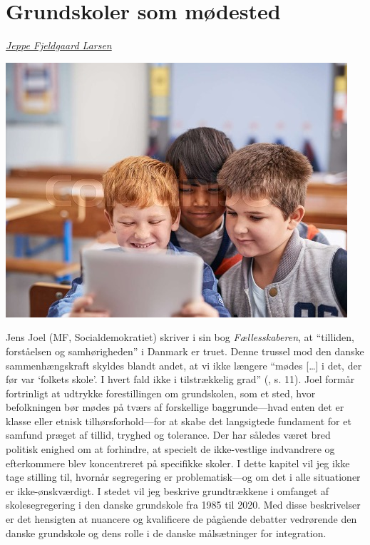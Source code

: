 \documentclass[
]{book}
\begin{document}
\chapter{Grundskoler som mødested}\label{kap4}

\emph{\href{https://vbn.aau.dk/da/persons/jeppefl}{Jeppe Fjeldgaard Larsen}}

\includegraphics[width=1\linewidth]{images/kap4}

Jens Joel (MF, Socialdemokratiet) skriver i sin bog \emph{Fællesskaberen}, at ``tilliden, forståelsen og samhørigheden'' i Danmark er truet. Denne trussel mod den danske sammenhængskraft skyldes blandt andet, at vi ikke længere ``mødes {[}\ldots{]} i det, der før var `folkets skole'. I hvert fald ikke i tilstrækkelig grad'' (, s. 11). Joel formår fortrinligt at udtrykke forestillingen om grundskolen, som et sted, hvor befolkningen bør mødes på tværs af forskellige baggrunde---hvad enten det er klasse eller etnisk tilhørsforhold---for at skabe det langsigtede fundament for et samfund præget af tillid, tryghed og tolerance. Der har således været bred politisk enighed om at forhindre, at specielt de ikke-vestlige indvandrere og efterkommere blev koncentreret på specifikke skoler. I dette kapitel vil jeg ikke tage stilling til, hvornår segregering er problematisk---og om det i alle situationer er ikke-ønskværdigt. I stedet vil jeg beskrive grundtrækkene i omfanget af skolesegregering i den danske grundskole fra 1985 til 2020. Med disse beskrivelser er det hensigten at nuancere og kvalificere de pågående debatter vedrørende den danske grundskole og dens rolle i de danske målsætninger for integration.
\end{document}
